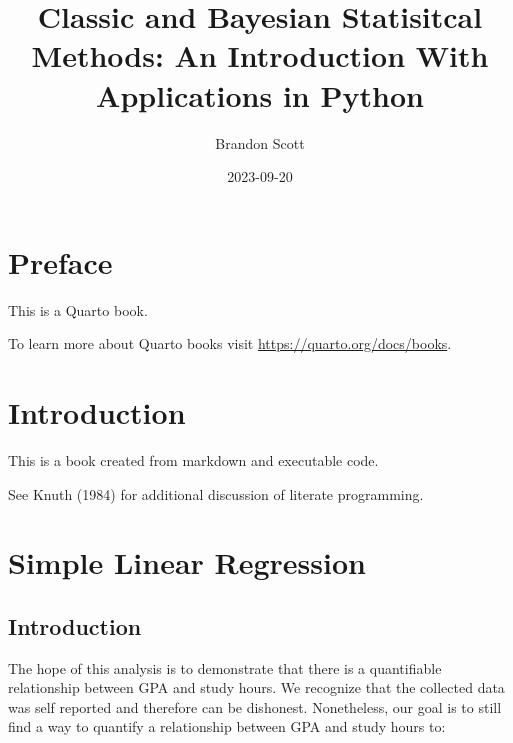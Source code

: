 \documentclass[
  letterpaper,
  DIV=11,
  numbers=noendperiod]{scrreprt}
\title{Classic and Bayesian Statisitcal Methods: An Introduction With
Applications in Python}
\author{Brandon Scott}
\date{2023-09-20}
\renewcommand*\contentsname{Table of contents}
\newcommand\contentsname{Table of contents}
\begin{document}
\maketitle
\ifdefined\Shaded\renewenvironment{Shaded}{\begin{tcolorbox}[sharp corners, boxrule=0pt, interior hidden, frame hidden, borderline west={3pt}{0pt}{shadecolor}, enhanced, breakable]}{\end{tcolorbox}}\fi

\renewcommand*\contentsname{Table of contents}
{
\hypersetup{linkcolor=}
\setcounter{tocdepth}{2}
\tableofcontents
}

\hypertarget{preface}{%
\chapter*{Preface}\label{preface}}


This is a Quarto book.

To learn more about Quarto books visit
\url{https://quarto.org/docs/books}.


\hypertarget{introduction}{%
\chapter{Introduction}\label{introduction}}

This is a book created from markdown and executable code.

See Knuth (1984) for additional discussion of literate programming.


\hypertarget{simple-linear-regression}{%
\chapter{Simple Linear Regression}\label{simple-linear-regression}}

\hypertarget{introduction-1}{%
\section{Introduction}\label{introduction-1}}

The hope of this analysis is to demonstrate that there is a quantifiable
relationship between GPA and study hours. We recognize that the
collected data was self reported and therefore can be dishonest.
Nonetheless, our goal is to still find a way to quantify a relationship
between GPA and study hours to:
\end{document}

